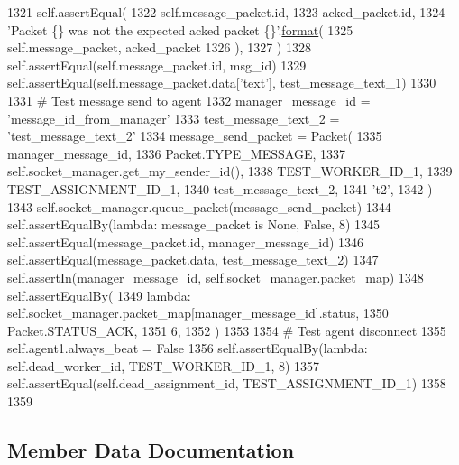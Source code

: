 \begin{DoxyCode}
1321         self.assertEqual(
1322             self.message\_packet.id,
1323             acked\_packet.id,
1324             \textcolor{stringliteral}{'Packet \{\} was not the expected acked packet \{\}'}.\hyperlink{namespaceparlai_1_1chat__service_1_1services_1_1messenger_1_1shared__utils_a32e2e2022b824fbaf80c747160b52a76}{format}(
1325                 self.message\_packet, acked\_packet
1326             ),
1327         )
1328         self.assertEqual(self.message\_packet.id, msg\_id)
1329         self.assertEqual(self.message\_packet.data[\textcolor{stringliteral}{'text'}], test\_message\_text\_1)
1330 
1331         \textcolor{comment}{# Test message send to agent}
1332         manager\_message\_id = \textcolor{stringliteral}{'message\_id\_from\_manager'}
1333         test\_message\_text\_2 = \textcolor{stringliteral}{'test\_message\_text\_2'}
1334         message\_send\_packet = Packet(
1335             manager\_message\_id,
1336             Packet.TYPE\_MESSAGE,
1337             self.socket\_manager.get\_my\_sender\_id(),
1338             TEST\_WORKER\_ID\_1,
1339             TEST\_ASSIGNMENT\_ID\_1,
1340             test\_message\_text\_2,
1341             \textcolor{stringliteral}{'t2'},
1342         )
1343         self.socket\_manager.queue\_packet(message\_send\_packet)
1344         self.assertEqualBy(\textcolor{keyword}{lambda}: message\_packet \textcolor{keywordflow}{is} \textcolor{keywordtype}{None}, \textcolor{keyword}{False}, 8)
1345         self.assertEqual(message\_packet.id, manager\_message\_id)
1346         self.assertEqual(message\_packet.data, test\_message\_text\_2)
1347         self.assertIn(manager\_message\_id, self.socket\_manager.packet\_map)
1348         self.assertEqualBy(
1349             \textcolor{keyword}{lambda}: self.socket\_manager.packet\_map[manager\_message\_id].status,
1350             Packet.STATUS\_ACK,
1351             6,
1352         )
1353 
1354         \textcolor{comment}{# Test agent disconnect}
1355         self.agent1.always\_beat = \textcolor{keyword}{False}
1356         self.assertEqualBy(\textcolor{keyword}{lambda}: self.dead\_worker\_id, TEST\_WORKER\_ID\_1, 8)
1357         self.assertEqual(self.dead\_assignment\_id, TEST\_ASSIGNMENT\_ID\_1)
1358 
1359 
\end{DoxyCode}


\subsection{Member Data Documentation}
\mbox{\label{classparlai_1_1mturk_1_1core_1_1test_1_1test__socket__manager_1_1TestSocketManagerMessageHandling_a0614318e90f07751f2730a2b2061e7eb}} 
